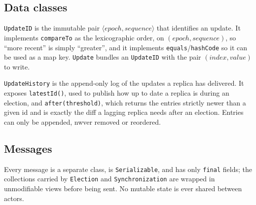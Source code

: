 \subsection*{Data classes}
\texttt{UpdateID} is the immutable pair $\langle epoch, sequence \rangle$ that identifies an update. It implements \texttt{compareTo} as the lexicographic order, on $(epoch, sequence)$, so ``more recent'' is simply ``greater'', and it implements \texttt{equals}/\texttt{hashCode} so it can be used as a map key. \texttt{Update} bundles an \texttt{UpdateID} with the pair $(index, value)$ to write.

\texttt{UpdateHistory} is the append-only log of the updates a replica has delivered. It exposes \texttt{latestId()}, used to publish how up to date a replica is during an election, and \texttt{after(threshold)}, which returns the entries strictly newer than a given id and is exactly the diff a lagging replica needs after an election. Entries can only be appended, nwver removed or reordered.

\subsection*{Messages}

Every message is a separate class, is \texttt{Serializable}, and has only \texttt{final} fields; the collections carried by \texttt{Election} and \texttt{Synchronization} are wrapped in unmodifiable views before being sent. No mutable state is ever shared between actors.

